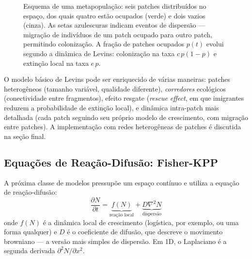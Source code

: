 \begin{figure}[htbp]
\centering
{}
\caption{Esquema de uma metapopulação: seis patches distribuídos no espaço, dos quais quatro estão ocupados (verde) e dois vazios (cinza). As setas azulescuras indicam eventos de dispersão --- migração de indivíduos de um patch ocupado para outro patch, permitindo colonização. A fração de patches ocupados $p(t)$ evolui segundo a dinâmica de Levins: colonização na taxa $c\,p(1-p)$ e extinção local na taxa $e\,p$.}
\label{fig:10-metapop}
\end{figure}

O modelo básico de Levins pode ser enriquecido de várias maneiras: patches
heterogêneos (tamanho variável, qualidade diferente), \emph{corredores}
ecológicos (conectividade entre fragmentos), efeito resgate (\emph{rescue effect},
em que imigrantes reduzem a probabilidade de extinção local), e dinâmica
intra-patch mais detalhada (cada patch seguindo seu próprio modelo de
crescimento, com migração entre patches). A implementação com redes
heterogêneas de patches é discutida na seção final.

\subsection{Equações de Reação-Difusão: Fisher-KPP}
\label{sub:image10-fisher-kpp}

A próxima classe de modelos pressupõe um espaço contínuo e utiliza a equação
de reação-difusão:
\begin{equation}
\frac{\partial N}{\partial t} = \underbrace{f(N)}_{\text{reação local}}
                              + \underbrace{D \nabla^2 N}_{\text{dispersão}}
\end{equation}
onde $f(N)$ é a dinâmica local de crescimento (logística, por exemplo, ou uma
forma qualquer) e $D$ é o coeficiente de difusão, que descreve o movimento
browniano --- a versão mais simples de dispersão. Em 1D, o Laplaciano é a
segunda derivada $\partial^2 N/\partial x^2$.

